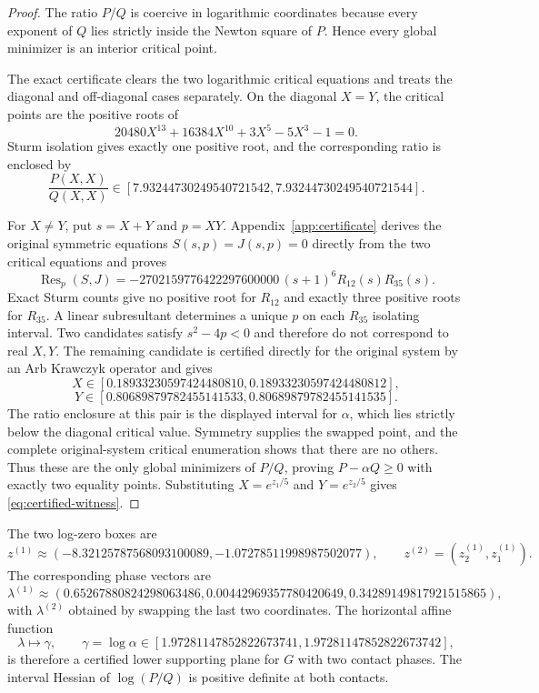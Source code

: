 \documentclass[11pt]{article}
\theoremstyle{plain}
\theoremstyle{definition}
\theoremstyle{remark}
\begin{document}
\begin{proof}
The ratio $P/Q$ is coercive in logarithmic coordinates because every exponent of $Q$ lies strictly inside the Newton square of $P$.  Hence every global minimizer is an interior critical point.

The exact certificate clears the two logarithmic critical equations and treats the diagonal and off-diagonal cases separately.  On the diagonal $X=Y$, the critical points are the positive roots of
\[
 20480X^{13}+16384X^{10}+3X^5-5X^3-1=0.
\]
Sturm isolation gives exactly one positive root, and the corresponding ratio is enclosed by
\[
 \frac{P(X,X)}{Q(X,X)}
 \in[7.93244730249540721542,7.93244730249540721544].
\]

For $X\ne Y$, put $s=X+Y$ and $p=XY$. Appendix~\ref{app:certificate} derives the original symmetric equations $S(s,p)=J(s,p)=0$ directly from the two critical equations and proves
\[
 \operatorname{Res}_p(S,J)=
 -2702159776422297600000\,(s+1)^6R_{12}(s)R_{35}(s).
\]
Exact Sturm counts give no positive root for $R_{12}$ and exactly three positive roots for $R_{35}$. A linear subresultant determines a unique $p$ on each $R_{35}$ isolating interval. Two candidates satisfy $s^2-4p<0$ and therefore do not correspond to real $X,Y$. The remaining candidate is certified directly for the original system by an Arb Krawczyk operator and gives
\[
 X\in[0.18933230597424480810,0.18933230597424480812],
\]
\[
 Y\in[0.80689879782455141533,0.80689879782455141535].
\]
The ratio enclosure at this pair is the displayed interval for $\alpha$, which lies strictly below the diagonal critical value. Symmetry supplies the swapped point, and the complete original-system critical enumeration shows that there are no others. Thus these are the only global minimizers of $P/Q$, proving $P-\alpha Q\ge0$ with exactly two equality points. Substituting $X=e^{z_1/5}$ and $Y=e^{z_2/5}$ gives \eqref{eq:certified-witness}.
\end{proof}

The two log-zero boxes are
\[
 z^{(1)}\approx(-8.32125787568093100089,-1.07278511998987502077),
 \qquad
 z^{(2)}=(z^{(1)}_2,z^{(1)}_1).
\]
The corresponding phase vectors are
\[
 \lambda^{(1)}\approx
 (0.65267880824298063486,
  0.00442969357780420649,
  0.34289149817921515865),
\]
with $\lambda^{(2)}$ obtained by swapping the last two coordinates.  The horizontal affine function
\[
 \lambda\longmapsto\gamma,
 \qquad
 \gamma=\log\alpha
 \in[1.97281147852822673741,1.97281147852822673742],
\]
is therefore a certified lower supporting plane for $G$ with two contact phases. The interval Hessian of $\log(P/Q)$ is positive definite at both contacts.
\end{document}
